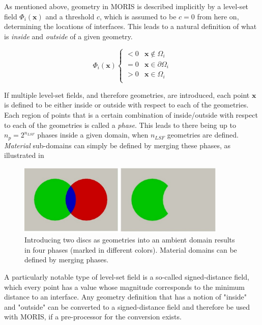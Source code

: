 As mentioned above, geometry in MORIS is described implicitly by a level-set field $\Phi_i(\bm{x})$ and a threshold $c$, which is assumed to be $c=0$ from here on, determining the locations of interfaces. 
This leads to a natural definition of what is \emph{inside} and \emph{outside} of a given geometry. 

\begin{equation}
\label{eq:level_set_field}
    \Phi_i(\bm{x}) 
    \begin{cases}
        < 0 & \bm{x} \notin \Omega_i \\
        = 0 & \bm{x} \in \partial\Omega_i \\
        > 0 & \bm{x} \in \Omega_i \\
    \end{cases}
\end{equation}

\hypertarget{phase_assignment}{}
If multiple level-set fields, and therefore geometries, are introduced, each point $\bm{x}$ is defined to be either inside or outside with respect to each of the geometries. Each region of points that is a certain combination of inside/outside with respect to each of the geometries is called a \emph{phase}. This leads to there being up to $n_p = 2^{n_{LSF}}$ phases inside a given domain, when $n_{LSF}$ geometries are defined. \emph{Material} sub-domains can simply be defined by merging these phases, as illustrated in 

\begin{figure}[h]
    \begin{center}
    \includegraphics[width=10cm]{Figures/phase_merging.png}
    \caption{Introducing two discs as geometries into an ambient domain results in four phases (marked in different colors). Material domains can be defined by merging phases. } 
    \label{fig:phase_mergin}
    \end{center}
\end{figure}

A particularly notable type of level-set field is a so-called signed-distance field, which every point has a value whose magnitude corresponds to the minimum distance to an interface.
Any geometry definition that has a notion of "inside" and "outside" can be converted to a signed-distance field and therefore be used with MORIS, if a pre-processor for the conversion exists.


